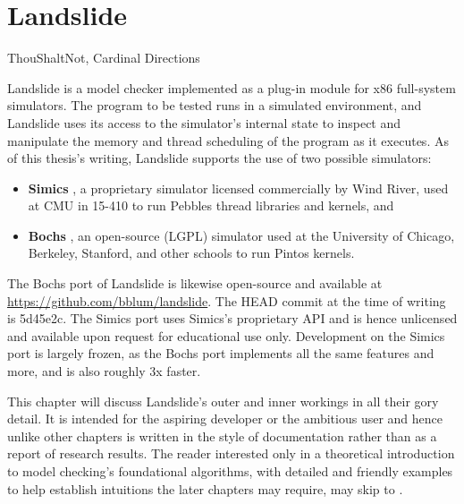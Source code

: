 \chapter{Landslide}
\label{chap:landslide}

{ThouShaltNot, Cardinal Directions}

Landslide is a model checker implemented as a plug-in module for x86 full-system simulators.
The program to be tested runs in a simulated environment,
and Landslide uses its access to the simulator's internal state to inspect and manipulate the memory and thread scheduling of the program as it executes.
As of this thesis's writing, Landslide supports the use of two possible simulators:

\begin{itemize}
	\item {\bf Simics} \cite{simics}, a proprietary simulator licensed commercially by Wind River, used at CMU in 15-410 to run Pebbles thread libraries and kernels, and
	\item {\bf Bochs} \cite{bochs}, an open-source (LGPL) simulator used at the University of Chicago, Berkeley, Stanford, and other schools to run Pintos kernels.
\end{itemize}

The Bochs port of Landslide is likewise open-source and available at \url{https://github.com/bblum/landslide}.
The HEAD commit at the time of writing is 5d45e2c.
The Simics port uses Simics's proprietary API and is hence unlicensed and available upon request for educational use only.
Development on the Simics port is largely frozen,
as the Bochs port implements all the same features and more,
and is also roughly 3x faster.

This chapter will discuss Landslide's outer and inner workings in all their gory detail.
It is intended for the aspiring developer or the ambitious user
and hence unlike other chapters is written in the style of documentation rather than as a report of research results.
The reader interested only in a theoretical introduction to model checking's foundational algorithms,
with detailed and friendly examples to help establish intuitions the later chapters may require,
may skip to \sect{\ref{sec:landslide-algs}}.


